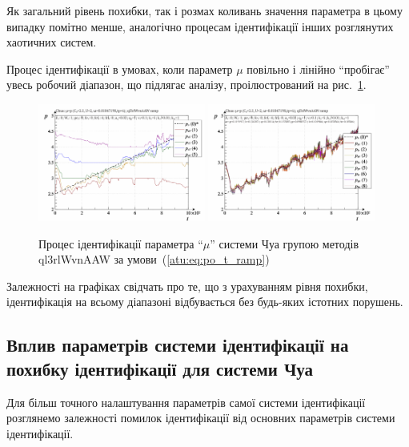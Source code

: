 Як загальний рівень похибки, так і розмах коливань значення
параметра в цьому випадку помітно менше, аналогічно процесам
ідентифікації інших розглянутих хаотичних систем.

Процес ідентифікації в умовах, коли параметр
$ \mu $ повільно і лінійно ``пробігає'' увесь робочий
діапазон, що підлягає аналізу, проілюстрований на рис.~\ref{atu:f:chua_id_ql3rlWvnAAW_ramp}.

\begin{figure}[htb!]
  \centerline{
    \includegraphics[width=0.49\textwidth]{p/cha/chua/ql3rlWvnAAW/chua_id-p_t_pi_ql3rlWvnAAW_ramp.png}
    \hfill
    \includegraphics[width=0.49\textwidth]{p/cha/chua/ql3rlWvnAAW/chua_id-p_t_p_ql3rlWvnAAW_ramp.png}
  }
\caption{Процес ідентифікації параметра ``$\mu$'' системи Чуа групою методів ql3rlWvnAAW за умови~(\ref{atu:eq:po_t_ramp})}
\label{atu:f:chua_id_ql3rlWvnAAW_ramp}
\end{figure}

Залежності на графіках свідчать про те, що з урахуванням рівня
похибки, ідентифікація на всьому діапазоні відбувається без
будь-яких істотних порушень.




\subsection{Вплив параметрів системи ідентифікації на похибку ідентифікації для системи Чуа} %

Для більш точного налаштування параметрів самої системи
ідентифікації розглянемо залежності помилок ідентифікації
від основних параметрів системи ідентифікації.

